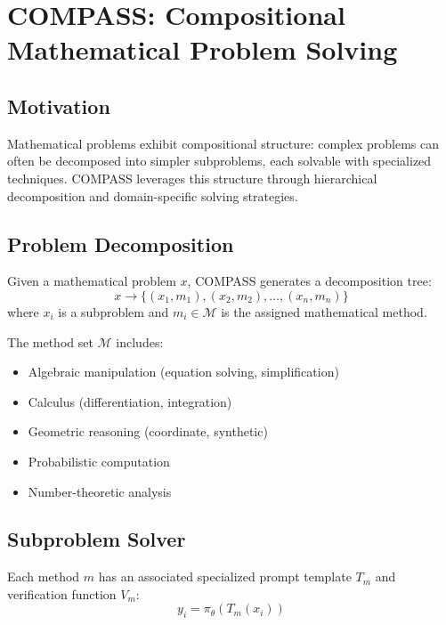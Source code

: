 \documentclass[11pt,a4paper]{article}
\begin{document}
\section{COMPASS: Compositional Mathematical Problem Solving}

\subsection{Motivation}

Mathematical problems exhibit compositional structure: complex problems can often be decomposed into simpler subproblems, each solvable with specialized techniques. COMPASS leverages this structure through hierarchical decomposition and domain-specific solving strategies.

\subsection{Problem Decomposition}

Given a mathematical problem $x$, COMPASS generates a decomposition tree:
\begin{equation}
    x \rightarrow \{(x_1, m_1), (x_2, m_2), \ldots, (x_n, m_n)\}
\end{equation}
where $x_i$ is a subproblem and $m_i \in \mathcal{M}$ is the assigned mathematical method.

The method set $\mathcal{M}$ includes:
\begin{itemize}
    \item Algebraic manipulation (equation solving, simplification)
    \item Calculus (differentiation, integration)
    \item Geometric reasoning (coordinate, synthetic)
    \item Probabilistic computation
    \item Number-theoretic analysis
\end{itemize}

\subsection{Subproblem Solver}

Each method $m$ has an associated specialized prompt template $T_m$ and verification function $V_m$:
\begin{equation}
    y_i = \pi_\theta(T_m(x_i))
\end{equation}
\end{document}
